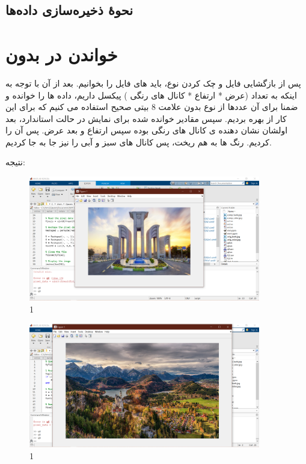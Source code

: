 \documentclass{article}
\begin{document}
	\subsection{نحوۀ ذخیره‌سازی داده‌ها}
	
	\section{خواندن  در  بدون }

\lr{}

پس از بازگشایی فایل  و چک کردن نوع، باید  های فایل را بخوانیم. بعد از آن با توجه به اینکه به تعداد (عرض * ارتفاع * کانال های رنگی ) پیکسل داریم، داده ها را خوانده و ضمنا برای آن عددها از نوع بدون علامت 8 بیتی  صحیح استفاده می کنیم که برای این کار از  بهره بردیم. سپس مقادیر خوانده شده برای نمایش در حالت استاندارد، بعد اولشان نشان دهنده ی کانال های رنگی بوده سپس ارتفاع و بعد عرض. پس آن را   کردیم. رنگ ها به هم ریخت، پس کانال های سبز و آبی را نیز جا به جا کردیم. \cite{4}

نتیجه: 
\begin{figure}[H]
	\centering
	\includegraphics[width=0.9\textwidth]{1.png}
	\caption{1}
\end{figure}

\begin{figure}[H]
	\centering
	\includegraphics[width=0.9\textwidth]{2.png}
	\caption{1}
\end{figure}
\end{document}
